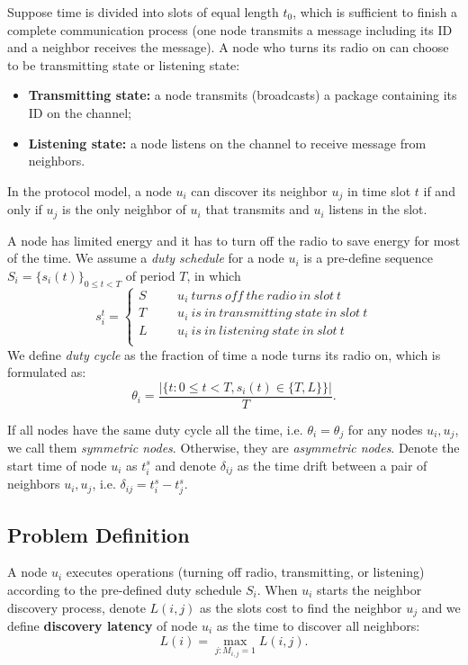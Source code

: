 Suppose time is divided into slots of equal length $t_0$, which is sufficient to finish a complete communication process (one node transmits a message including its ID and a neighbor receives the message). 
A node who turns its radio on can choose to be transmitting state or listening state:
\begin{itemize}
\item \textbf{Transmitting state:} a node transmits (broadcasts) a package containing its ID on the channel;
\item  \textbf{Listening state:} a node listens on the channel to receive message from neighbors.
\end{itemize}
In the protocol model, a node $u_i$ can discover its neighbor $u_j$ in time slot $t$ if and only if $u_j$ is the only neighbor of $u_i$ that transmits and $u_i$ listens in the slot.

A node has limited energy and it has to turn off the radio to save energy for most of the time. We assume a \emph{duty schedule} for a node $u_i$ is a pre-define sequence $S_i=\{s_i(t)\}_{0\leq t<T}$ of period $T$, in which
$$ s_i^t=\left\{
\begin{aligned}
S  & & & {u_i ~turns~ off~ the~ radio~ in~ slot~ t}  	 \\
T  & & & {u_i ~is~ in~ transmitting~ state~ in~ slot~ t}	\\
L  & & & {u_i ~is~ in~ listening~ state~ in~ slot~ t}	\\
\end{aligned}
\right.
$$
We define \emph{duty cycle} as the fraction of time a node turns its radio on, which is formulated as:
$$\theta_i=\frac{|\{t: 0\leq t<T, s_i(t) \in \{T,L\}\}|}{T}.
$$

If all nodes have the same duty cycle all the time, i.e. $\theta_i = \theta_j$ for any nodes $u_i, u_j$, we call them \emph{symmetric nodes}. Otherwise, they are \emph{asymmetric nodes}. Denote the start time of node $u_i$ as $t_i^s$ and denote $\delta_{ij}$ as the time drift between a pair of neighbors $u_i, u_j$, i.e. $\delta_{ij} = t_i^s - t_j^s$.

\subsection{Problem Definition}

A node $u_i$ executes operations (turning off radio, transmitting, or listening) according to the pre-defined duty schedule $S_i$. 
When $u_i$ starts the neighbor discovery process, denote $L(i,j)$ as the slots cost to find the neighbor $u_j$ and we define \textbf{discovery latency} of node $u_i$ as the time to discover all neighbors:
$$L(i) = \max_{j:M_{i,j}=1} L(i,j).
$$

